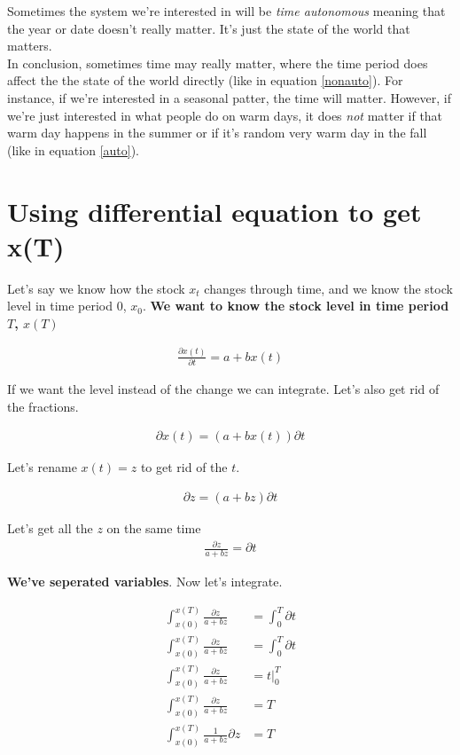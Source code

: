 \documentclass{article}
\begin{document}
Sometimes the system we're interested in will be \textit{time autonomous} meaning that the year or date doesn't really matter. It's just the state of the world that matters. \\

In conclusion, sometimes time may really matter, where the time period does affect the the state of the world directly (like in equation \ref{nonauto}). For instance, if we're interested in a seasonal patter, the time will matter. However, if we're just interested in what people do on warm days, it does \textit{not} matter if that warm day happens in the summer or if it's random very warm day in the fall (like in equation \ref{auto}). 

\section{Using differential equation to get x(T)}

Let's say we know how the stock $x_t$ changes through time, and we know the stock level in time period $0$, $x_0$. \textbf{We want to know the stock level in time period $T$, $x(T)$}

\begin{align*}
    \frac{\partial x(t)}{\partial t} = a + bx(t)
\end{align*}

If we want the level instead of the change we can integrate. Let's also get rid of the fractions. 

\begin{align*}
    \partial x(t) = (a + b x(t)) \partial t
\end{align*}

Let's rename $x(t) = z$ to get rid of the $t$. 

\begin{align}
    \partial z = (a + b z) \partial t
\end{align}

Let's get all the $z$ on the same time 
\begin{align*}
    \frac{\partial z}{a + b z} = \partial t
\end{align*}

\textbf{We've seperated variables}. Now let's integrate. 

\begin{align*}
    \int_{x(0)}^{x(T)} \frac{\partial z}{a + b z} &= \int_0^T \partial t\\
     \int_{x(0)}^{x(T)} \frac{\partial z}{a + b z} &= \int_0^T \partial t\\
     \int_{x(0)}^{x(T)} \frac{\partial z}{a + b z} &= t|_0^T \\
     \int_{x(0)}^{x(T)} \frac{\partial z}{a + b z} &= T \\
     \int_{x(0)}^{x(T)} \frac{1}{a + b z} \partial z &= T
\end{align*}
\end{document}
